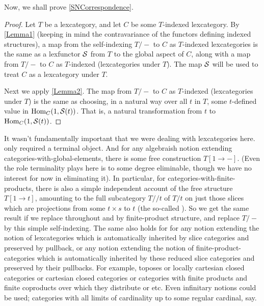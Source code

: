Now, we shall prove \cref{SNCorrespondence}.

\begin{proof}
Let $T$ be a lexcategory, and let $C$ be some $T$-indexed lexcategory. By \cref{Lemma1} (keeping in mind the contravariance of the functors defining indexed structures), a map from the self-indexing $T/-$ to $C$ as $T$-indexed lexcategories is the same as a lexfunctor $\mathcal{S}$ from $T$ to the global aspect of $C$, along with a map from $T/-$ to $C$ as $T$-indexed (lexcategories under $T$). The map $\mathcal{S}$ will be used to treat $C$ as a lexcategory under $T$.

Next we apply \cref{Lemma2}. The map from $T/-$ to $C$ as $T$-indexed (lexcategories under $T$) is the same as choosing, in a natural way over all $t$ in $T$, some $t$-defined value in $\operatorname{Hom}_C(1, \mathcal{S}(t))$. That is, a natural transformation from $t$ to $\operatorname{Hom}_C(1, \mathcal{S}(t))$.
\end{proof}

\begin{remark}\label{IntrospGeneralDoctrine}
It wasn't fundamentally important that we were dealing with lexcategories here.  only required a terminal object. And for any algebraish notion extending categories-with-global-elements, there is some free construction $T[1 \to -]$. (Even the role terminality plays here is to some degree eliminable, though we have no interest for now in eliminating it). In particular, for categories-with-finite-products, there is also a simple independent account of the free structure $T[1 \to t]$, amounting to the full subcategory $T//t$ of $T/t$ on just those slices which are projections from some $t \times s$ to $t$ (the so-called ). So we get the same result if we replace throughout  and  by finite-product structure, and replace $T/-$ by this simple self-indexing. The same also holds for for any notion extending the notion of lexcategories which is automatically inherited by slice categories and preserved by pullback, or any notion extending the notion of finite-product-categories which is automatically inherited by these reduced slice categories and preserved by their pullbacks. For example, toposes or locally cartesian closed categories or cartesian closed categories or categories with finite products and finite coproducts over which they distribute or etc. Even infinitary notions could be used; categories with all limits of cardinality up to some regular cardinal, say.
\end{remark}

